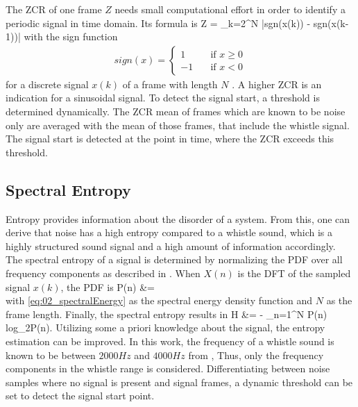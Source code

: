 The \ac{ZCR} of one frame $Z$ needs small computational effort in order to
identify a periodic signal in time domain.
Its formula is
\bal
    Z = \sum_{k=2}^N |sgn(x(k)) - sgn(x(k-1))|
    \label{eq:02_zcr}
\eal
with the sign function
\begin{align*}
    sign(x) =
    \begin{cases}
        1 & \quad \text{if } x\geq 0 \\
        -1 & \quad \text{if } x < 0
    \end{cases}
\end{align*}
for a discrete signal $x(k)$ of a frame with length $N$ \cite{Z_W_voiceActivity}.
A higher \ac{ZCR} is an indication for a sinusoidal signal.
To detect the signal start, a threshold is determined dynamically.
The \ac{ZCR} mean of frames which are known to be noise only
are averaged with the mean of those frames, that include the whistle signal.
The signal start is detected at the point in time, where the \ac{ZCR} exceeds
this threshold.

\subsection{Spectral Entropy}
\label{subsec:02_Entropy}

Entropy provides information about the disorder of a system.
From this, one can derive that noise has a high entropy compared to
a whistle sound, which is a highly structured sound signal and a high
amount of information accordingly.
The spectral entropy of a signal is determined by normalizing the
\ac{PDF} over all frequency components as described in \cite{S_J_entropy}.
When $X(n)$ is the \ac{DFT} of the sampled signal $x(k)$, the \ac{PDF} is
\bal
    P(n) &= 
    \label{eq:02_pdf}\\
\eal
with \ref{eq:02_spectralEnergy} as the spectral energy density function and $N$
as the frame length.
Finally, the spectral entropy results in
\bal
    H &= - \sum_{n=1}^N P(n) log_2P(n).
\eal
\label{eq:02_entropy}
Utilizing some a priori knowledge about the signal, the entropy estimation
can be improved.
In this work, the frequency of a whistle sound is known to be
between $2000\si{Hz}$ and $4000\si{Hz}$ from \cite{Hasselbring},
Thus, only the frequency components in the whistle range is considered.
Differentiating between noise samples where no signal is present and
signal frames, a dynamic threshold can be set to detect the signal start point.